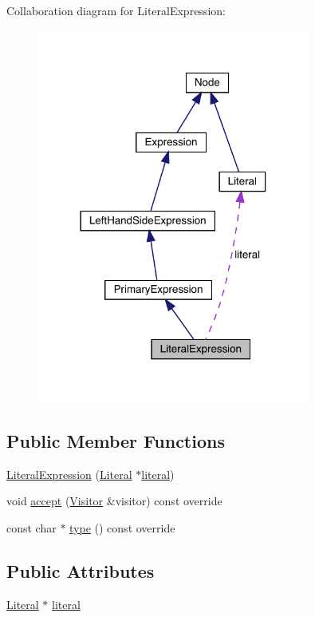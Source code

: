 Collaboration diagram for Literal\+Expression\+:\nopagebreak
\begin{figure}[H]
\begin{center}
\leavevmode
\includegraphics[width=254pt]{struct_literal_expression__coll__graph}
\end{center}
\end{figure}
\subsection*{Public Member Functions}
\begin{DoxyCompactItemize}
\item 
\hyperlink{struct_literal_expression_a1675f7d7132e9b5944fa6f94789e8847}{Literal\+Expression} (\hyperlink{struct_literal}{Literal} $\ast$\hyperlink{struct_literal_expression_a9d2347f8e6e56bd6e43f12954db93926}{literal})
\item 
void \hyperlink{struct_literal_expression_a803968c0fd7ae048314c7812d992d995}{accept} (\hyperlink{struct_visitor}{Visitor} \&visitor) const override
\item 
const char $\ast$ \hyperlink{struct_literal_expression_a2c02bac28c4d9422580a1defa0b7506c}{type} () const override
\end{DoxyCompactItemize}
\subsection*{Public Attributes}
\begin{DoxyCompactItemize}
\item 
\hyperlink{struct_literal}{Literal} $\ast$ \hyperlink{struct_literal_expression_a9d2347f8e6e56bd6e43f12954db93926}{literal}
\end{DoxyCompactItemize}


